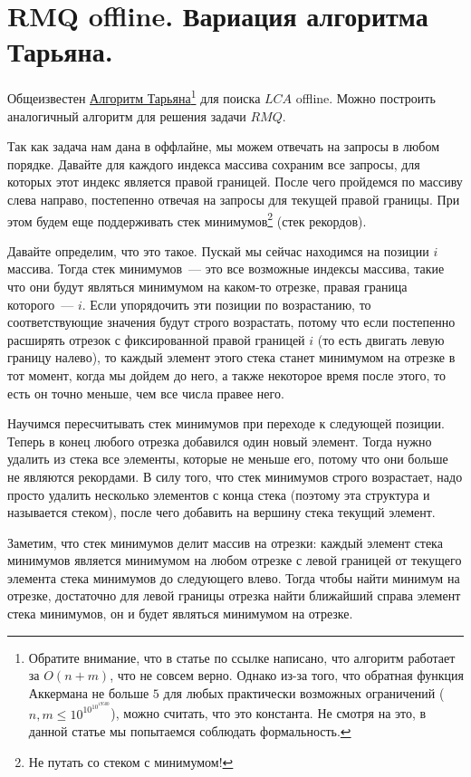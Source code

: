 \chapter{RMQ offline. Вариация алгоритма Тарьяна.} \label{rmq-offline}


Общеизвестен \href{https://e-maxx.ru/algo/lca_linear_offline}{Алгоритм Тарьяна}\footnote{Обратите внимание, что в статье по ссылке написано, что алгоритм работает за $O(n + m)$, что не совсем верно. Однако из-за того, что обратная функция Аккермана не больше $5$ для любых практически возможных ограничений ($n, m \le 10^{10^{10^{19500}}}$), можно считать, что это константа. Не смотря на это, в данной статье мы попытаемся соблюдать формальность.} для поиска $LCA$ offline. Можно построить аналогичный алгоритм для решения задачи $RMQ$.

Так как задача нам дана в оффлайне, мы можем отвечать на запросы в любом порядке. Давайте для каждого индекса массива сохраним все запросы, для которых этот индекс является правой границей. После чего пройдемся по массиву слева направо, постепенно отвечая на запросы для текущей правой границы. При этом будем еще поддерживать стек минимумов\footnote{Не путать со стеком с минимумом!} (стек рекордов).

Давайте определим, что это такое. Пускай мы сейчас находимся на позиции $i$ массива. Тогда стек минимумов~--- это все возможные индексы массива, такие что они будут являться минимумом на каком-то отрезке, правая граница которого~--- $i$. Если упорядочить эти позиции по возрастанию, то соответствующие значения будут строго возрастать, потому что если постепенно расширять отрезок с фиксированной правой границей $i$ (то есть двигать левую границу налево), то каждый элемент этого стека станет минимумом на отрезке в тот момент, когда мы дойдем до него, а также некоторое время после этого, то есть он точно меньше, чем все числа правее него.

Научимся пересчитывать стек минимумов при переходе к следующей позиции. Теперь в конец любого отрезка добавился один новый элемент. Тогда нужно удалить из стека все элементы, которые не меньше его, потому что они больше не являются рекордами. В силу того, что стек минимумов строго возрастает, надо просто удалить несколько элементов с конца стека (поэтому эта структура и называется стеком), после чего добавить на вершину стека текущий элемент.

Заметим, что стек минимумов делит массив на отрезки: каждый элемент стека минимумов является минимумом на любом отрезке с левой границей от текущего элемента стека минимумов до следующего влево. Тогда чтобы найти минимум на отрезке, достаточно для левой границы отрезка найти ближайший справа элемент стека минимумов, он и будет являться минимумом на отрезке.

